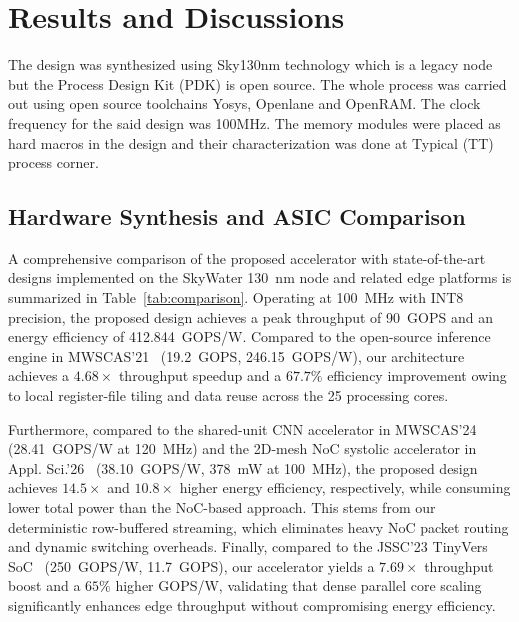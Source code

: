 \documentclass[conference]{IEEEtran}
\begin{document}
\section{Results and Discussions}
\label{sec:results}
The design was synthesized using Sky130nm technology which is a legacy node but the Process Design Kit (PDK) is open source. The whole process was carried out using open source toolchains Yosys, Openlane and OpenRAM. The clock frequency for the said design was 100MHz. The memory modules were placed as hard macros in the design and their characterization was done at Typical (TT) process corner.

\subsection{Hardware Synthesis and ASIC Comparison}
A comprehensive comparison of the proposed accelerator with state-of-the-art designs implemented on the SkyWater 130~nm node and related edge platforms is summarized in Table~\ref{tab:comparison}. Operating at 100~MHz with INT8 precision, the proposed design achieves a peak throughput of 90~GOPS and an energy efficiency of 412.844~GOPS/W. Compared to the open-source inference engine in MWSCAS'21~\cite{Nasser2021} (19.2~GOPS, 246.15~GOPS/W), our architecture achieves a $4.68\times$ throughput speedup and a $67.7\%$ efficiency improvement owing to local register-file tiling and data reuse across the 25 processing cores. 

Furthermore, compared to the shared-unit CNN accelerator in MWSCAS'24~\cite{Khalil2024} (28.41~GOPS/W at 120~MHz) and the 2D-mesh NoC systolic accelerator in Appl. Sci.'26~\cite{Mascorro2026} (38.10~GOPS/W, 378~mW at 100~MHz), the proposed design achieves $14.5\times$ and $10.8\times$ higher energy efficiency, respectively, while consuming lower total power than the NoC-based approach. This stems from our deterministic row-buffered streaming, which eliminates heavy NoC packet routing and dynamic switching overheads. Finally, compared to the JSSC'23 TinyVers SoC~\cite{TinyVers} (250~GOPS/W, 11.7~GOPS), our accelerator yields a $7.69\times$ throughput boost and a $65\%$ higher GOPS/W, validating that dense parallel core scaling significantly enhances edge throughput without compromising energy efficiency.
\end{document}
